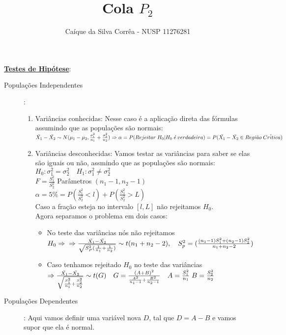 \documentclass[12pt, oneside]{article}
\title{Cola $P_2$}
\author{Caíque da Silva Corrêa - NUSP 11276281}
\newcommand{\mytitle}[1]{\textbf{\underline{#1}}}
\begin{document}
\maketitle
\mytitle{Testes de Hipótese}:\\
\begin{description}
\item[Populações Independentes]:
  \begin{enumerate}
  \item Variâncias conhecidas: Nesse caso é a aplicação direta das fórmulas assumindo que as populações são normais:\\
    $\bar{X_1}-\bar{X_2}\sim N(\mu_1-\mu_2,\frac{\sigma_1^2}{n_1}+\frac{\sigma_2^2}{n_2})\Rightarrow \alpha = P(Rejeitar \; H_0|H_0 \; \acute{e} \: verdadeira)\\ = P(\bar{X_1}-\bar{X_2} \in Regi\tilde{a}o\; Cr\acute{i}tica)$\\
  \item Variâncias desconhecidas: Vamos testar as variâncias para saber se elas são iguais ou não, assmindo que as populações são normais:\\
    $H_0: \sigma_1^2 = \sigma_2^2 \quad{H_1}: \sigma_1^2\neq\sigma_2^2$\\
    $F=\frac{S_1^2}{S_2^2}$ Parâmetros $(n_1-1,n_2-1)$\\
    $\alpha = 5\% = P(\frac{S_1^2}{S_2^2}<l)+P(\frac{S_1^2}{S_2^2}>L)$\\
    Caso a fração esteja no intervalo $[l,L]$ não rejeitamos $H_0$.\\
    Agora separamos o problema em dois casos:
    \begin{itemize}
    \item No teste das variâncias nós não rejeitamos $H_0\Rightarrow\\ \Rightarrow\frac{\bar{X_1}-\bar{X_2}}{\sqrt{S_P^2(\frac{1}{n_1}+\frac{1}{n_2})}}\sim t(n_1+n_2-2),\quad{} S_p^2=(\frac{(n_1-1)S_1^2+(n_2-1)S_2^2}{n_1+n_2-2})$
    \item Caso tenhamos rejeitado $H_0$ no teste das variâncias $\Rightarrow \frac{\bar{X_1}-\bar{X_2}}{\sqrt{\frac{S_1^2}{n_1}+\frac{S_2^2}{n_2}}}\sim t(G) \quad{} \\G=\frac{(A+B)^2}{\frac{A^2}{n_1-1}+\frac{B^2}{n_2-1}} \quad{} A=\frac{S_1^2}{n_1} \; B=\frac{S_2^2}{n_2}$
    \end{itemize}
  \end{enumerate}
\item[Populações Dependentes]: Aqui vamos definir uma variável nova $D$, tal que $D=A-B$ e vamos supor que ela é normal.
\end{description}
\end{document}
